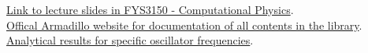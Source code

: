 \documentclass{article}
\begin{document}
\href{https://github.com/CompPhysics/ComputationalPhysics/blob/master/doc/Lectures/lectures2015.pdf}{Link to lecture slides in FYS3150 - Computational Physics}. \\

\href{http://arma.sourceforge.net/docs.html#eig_sym}{Offical Armadillo website for documentation of all contents in the library}. \\

\href{https://journals.aps.org/pra/pdf/10.1103/PhysRevA.48.3561}{Analytical results for specific oscillator frequencies}. \\








\end{document}
